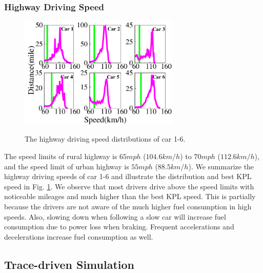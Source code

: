 \subsubsection{Highway Driving Speed}






\begin{figure}[!htbp]
\begin{center}
\includegraphics[width=3.0in,angle=0]{Figs/EcoDrive/evaluation/hwy_speeds.pdf}
\vspace{-0.0cm}
\caption{The highway driving speed distributions of car 1-6.}
\vspace{-0.6cm}
\label{highwayspeeds}
\end{center}
\end{figure}

The speed limits of rural highway is $65mph$ ($104.6km/h$) 
to $70mph$ ($112.6km/h$), and
the speed limit of urban highway is $55mph$ ($88.5km/h$). 
We summarize the highway driving speeds of car 1-6 
and illustrate the distribution and best KPL speed in Fig. \ref{highwayspeeds}. 
We observe that most drivers drive above the speed limits with
noticeable mileages and much higher than the best KPL speed. 
This is partially because the drivers are not aware of
the much higher fuel consumption in high speeds. 
Also, slowing down when following a slow car 
will increase fuel consumption due to power loss when braking. 
Frequent accelerations and decelerations increase
fuel consumption as well. 

\subsection{Trace-driven Simulation}


